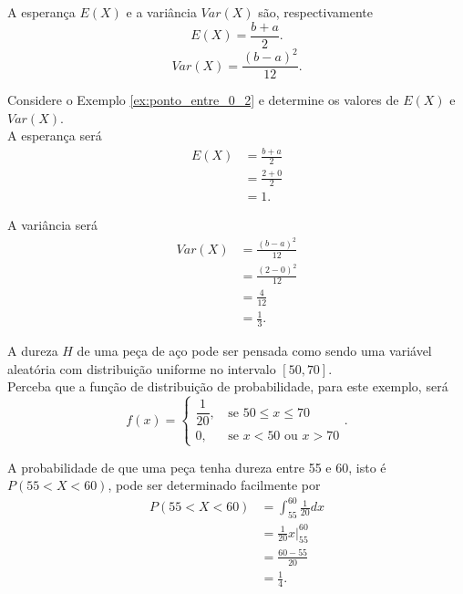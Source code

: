 \documentclass[11pt,fleqn]{book}
\numberwithin{mpicture}{chapter}
\numberwithin{mtable}{chapter}
\numberwithin{mframe}{chapter}
\begin{document}
A esperança $E(X)$ e a variância $Var(X)$ são, respectivamente
\begin{equation}
	E(X)=\frac{b+a}{2}
	\text{.}
\end{equation}
\begin{equation}
	Var(X)=\frac{(b-a)^2}{12}
	\text{.}
\end{equation}

\begin{example}
	Considere o Exemplo \ref{ex:ponto_entre_0_2} e determine os valores de $E(X)$ e $Var(X)$.\\
			
	A esperança será
		\begin{align*}
			E(X)&=\frac{b+a}{2}\\
				&=\frac{2+0}{2}\\
				&=1\text{.}
		\end{align*}
		
	A variância será
		\begin{align*}
			Var(X)&=\frac{(b-a)^2}{12}\\
				  &=\frac{(2-0)^2}{12}\\
				  &=\frac{4}{12}\\
				  &=\frac{1}{3}\text{.}
		\end{align*}
\end{example}

\begin{example}
	A dureza $H$ de uma peça de aço pode ser pensada como sendo uma variável aleatória com distribuição uniforme no intervalo $[50, 70]$. \\
	
	Perceba que a função de distribuição de probabilidade, para este exemplo, será
	\[
		f(x)=\begin{cases}
			\dfrac{1}{20}\text{,}&\text{ se } 50\leqslant x\leqslant 70\\
			0\text{,}&\text{ se } x<50\text{ ou }x>70
		\end{cases}\text{.}
	\]
	
	A probabilidade de que uma peça tenha dureza entre 55 e 60, isto é $P(55<X<60)$, pode ser determinado facilmente por
	\begin{align*}
		P(55<X<60)&=\int_{55}^{60} \frac{1}{20}dx\\
				  &=\frac{1}{20}x\Big|_{55}^{60}\\
				  &=\frac{60-55}{20}\\
				  &=\frac{1}{4}\text{.}
	\end{align*}
\end{example}
\end{document}
